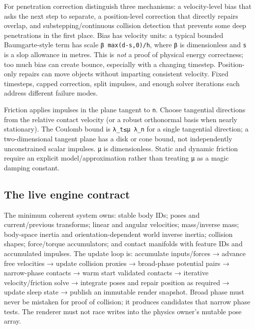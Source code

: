 For penetration correction distinguish three mechanisms: a velocity-level bias that asks the next step to separate, a position-level correction that directly repairs overlap, and substepping/continuous collision detection that prevents some deep penetrations in the first place. Bias has velocity units: a typical bounded Baumgarte-style term has scale \texttt{β\ max(d-s,0)/h}, where \texttt{β} is dimensionless and \texttt{s} is a slop allowance in metres. This is \emph{not} a proof of physical energy correctness; too much bias can create bounce, especially with a changing timestep. Position-only repairs can move objects without imparting consistent velocity. Fixed timesteps, capped correction, split impulses, and enough solver iterations each address different failure modes.

Friction applies impulses in the plane tangent to \texttt{n}. Choose tangential directions from the relative contact velocity (or a robust orthonormal basis when nearly stationary). The Coulomb bound is \texttt{\textbar{}λ\_t\textbar{}≤μ\ λ\_n} for a single tangential direction; a two-dimensional tangent plane has a disk or cone bound, not independently unconstrained scalar impulses. \texttt{μ} is dimensionless. Static and dynamic friction require an explicit model/approximation rather than treating \texttt{μ} as a magic damping constant.

\subsection{The live engine contract}\label{06-engine-ii-ch033-the-live-engine-contract}

\hypertarget{06-engine-ii-ch033-the-live-engine-contract}{}

The minimum coherent system owns: stable body IDs; poses and current/previous transforms; linear and angular velocities; mass/inverse mass; body-space inertia and orientation-dependent world inverse inertia; collision shapes; force/torque accumulators; and contact manifolds with feature IDs and accumulated impulses. The update loop is: accumulate inputs/forces → advance free velocities → update collision proxies → broad-phase potential pairs → narrow-phase contacts → warm start validated contacts → iterative velocity/friction solve → integrate poses and repair position as required → update sleep state → publish an immutable render snapshot. Broad phase must never be mistaken for proof of collision; it produces candidates that narrow phase tests. The renderer must not race writes into the physics owner's mutable pose array.

